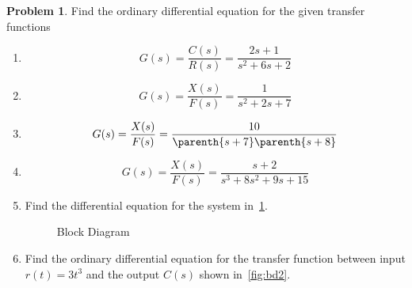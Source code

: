 \documentclass[10pt]{article}
\theoremstyle{definition}
\newtheorem{prob}{Problem}[section]
\newenvironment{subprob}%
{\renewcommand{\theenumi}{\alph{enumi}}\renewcommand{\labelenumi}{(\theenumi)}\begin{enumerate}}%
{\end{enumerate}}%
\begin{document}
\begin{prob}
    Find the ordinary differential equation for the given transfer functions
    \begin{subprob}
    \item \[ G(s) = \frac{C(s)}{R(s)} = \frac{2 s + 1}{s^2 + 6s + 2} \]
    \item \[ G(s) = \frac{X(s)}{F(s)} = \frac{1}{s^2 + 2s+7} \]
    \item \[ G(s) = \frac{X(s)}{F(s)} = \frac{10}{\parenth{s+7}\parenth{s+8}}\]
    \item \[ G(s) = \frac{X(s)}{F(s)} = \frac{s+2}{s^3 + 8s^2 + 9s+15}\]
    \item Find the differential equation for the system in~\cref{fig:blockdiagram}.
    \begin{figure}[h]
        \centering
            \caption{Block Diagram~\label{fig:blockdiagram}}
        \end{figure}

    \item Find the ordinary differential equation for the transfer function between input \( r(t) = 3 t^3 \) and the output \( C(s)\) shown in~\cref{fig:bd2}.
    \begin{figure}[h]
        \centering
        \begin{scaletikzpicturetowidth}{2\textwidth}
\end{scaletikzpicturetowidth}
\end{figure}
\end{subprob}
\end{prob}
\end{document}
